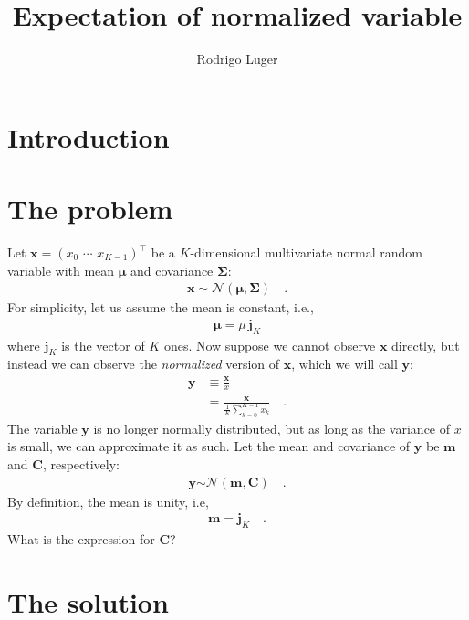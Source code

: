 \documentclass[modern]{aastex62}
\begin{document}
\title{%
    \textbf{
        Expectation of normalized variable
    }
}

\author{Rodrigo Luger}

\section{Introduction}
\citet{Luger2019}

\section{The problem}

Let $\mathbf{x} = \left( x_0 \,\, \cdots \,\, x_{K-1} \right)^\top$
be a $K$-dimensional multivariate normal random variable with mean $\pmb{\mu}$
and covariance $\pmb{\Sigma}$:
%
\begin{align}
    \mathbf{x} \sim \mathcal{N}\left( \pmb{\mu}, \pmb{\Sigma} \right)
    \quad.
\end{align}
%
For simplicity, let us assume the mean is constant, i.e.,
%
\begin{align}
    \pmb{\mu} = \mu \, \mathbf{j}_K
\end{align}
%
where $\mathbf{j}_K$ is the vector of $K$ ones.
%
Now suppose we cannot observe $\mathbf{x}$ directly, but instead we can
observe the \emph{normalized} version of $\mathbf{x}$, which we will call
$\mathbf{y}$:
%
\begin{align}
    \mathbf{y}
     & \equiv \frac{\mathbf{x}}{\bar{x}}
    \nonumber                                                      \\[0.5em]
     & = \frac{\mathbf{x}}{\frac{1}{K}\sum\limits_{k=0}^{K-1} x_k}
    \quad.
\end{align}
%
The variable $\mathbf{y}$ is no longer normally distributed, but as long as
the variance of $\bar{x}$ is small, we can approximate it as such. Let the mean
and covariance of $\mathbf{y}$ be $\mathbf{m}$ and $\mathbf{C}$, respectively:
%
\begin{align}
    \mathbf{y} \mathrel{\dot\sim} \mathcal{N}\left( \mathbf{m}, \mathbf{C} \right)
    \quad.
\end{align}
%
By definition, the mean is unity, i.e,
%
\begin{align}
    \mathbf{m} = \mathbf{j}_K
    \quad.
\end{align}
%
What is the expression for $\mathbf{C}$?

\section{The solution}
\end{document}
